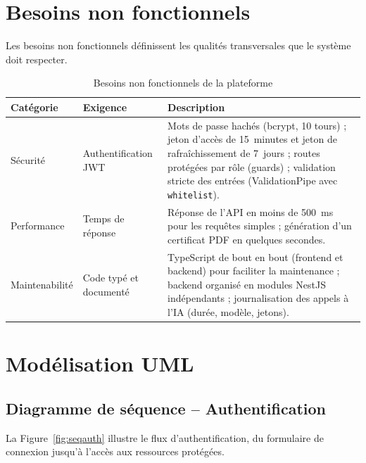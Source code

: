 \documentclass[12pt,a4paper]{report}
\begin{document}
\section{Besoins non fonctionnels}

Les besoins non fonctionnels définissent les qualités transversales que le système doit respecter.

\begin{table}[H]
\centering
\caption{Besoins non fonctionnels de la plateforme}
\begin{tabular}{|p{2.6cm}|p{4.2cm}|p{6.2cm}|}
\hline
\textbf{Catégorie} & \textbf{Exigence} & \textbf{Description} \\
\hline
Sécurité & Authentification JWT & Mots de passe hachés (bcrypt, 10 tours) ; jeton d'accès de 15~minutes et jeton de rafraîchissement de 7~jours ; routes protégées par rôle (guards) ; validation stricte des entrées (ValidationPipe avec \texttt{whitelist}). \\
\hline
Performance & Temps de réponse & Réponse de l'API en moins de 500~ms pour les requêtes simples ; génération d'un certificat PDF en quelques secondes. \\
\hline
Maintenabilité & Code typé et documenté & TypeScript de bout en bout (frontend et backend) pour faciliter la maintenance ; backend organisé en modules NestJS indépendants ; journalisation des appels à l'IA (durée, modèle, jetons). \\
\hline
\end{tabular}
\end{table}

\section{Modélisation UML}

\subsection{Diagramme de séquence -- Authentification}

La Figure~\ref{fig:seqauth} illustre le flux d'authentification, du formulaire de connexion jusqu'à l'accès aux ressources protégées.
\end{document}
